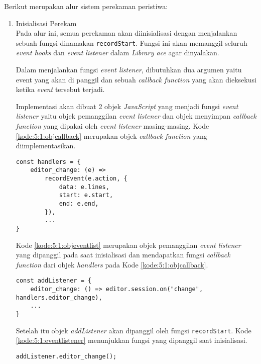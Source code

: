 Berikut merupakan alur sistem perekaman peristiwa:
\begin{enumerate}
    \item Inisialisasi Perekam \\
    Pada alur ini, semua perekaman akan diinisialisasi dengan menjalankan sebuah fungsi dinamakan \verb|recordStart|. Fungsi ini akan memanggil seluruh \textit{event hooks} dan \textit{event listener} dalam \textit{Library ace} agar dinyalakan. 
    
    Dalam menjalankan fungsi \textit{event listener}, dibutuhkan dua argumen yaitu event yang akan di panggil dan sebuah \textit{callback function} yang akan dieksekusi ketika \textit{event} tersebut terjadi. 
    
    Implementasi akan dibuat 2 objek \textit{JavaScript} yang menjadi fungsi \textit{event listener} yaitu objek pemanggilan \textit{event listener} dan objek menyimpan \textit{callback function} yang dipakai oleh \textit{event listener} masing-masing. Kode \ref{kode:5:1:objcallback} merupakan objek \textit{callback function} yang diimplementasikan.
    \begin{lstlisting}[caption={objek \textit{callback function}}, label={kode:5:1:objcallback}]
const handlers = {
    editor_change: (e) =>
        recordEvent(e.action, {
            data: e.lines,
            start: e.start,
            end: e.end,
        }),
        ...
}
    \end{lstlisting}
    
    Kode \ref{kode:5:1:objeventlist} merupakan objek pemanggilan \textit{event listener} yang dipanggil pada saat inisialisasi dan mendapatkan fungsi \textit{callback function} dari objek \textit{handlers} pada Kode \ref{kode:5:1:objcallback}.
    \begin{lstlisting}[caption={objek \textit{event listener}}, label={kode:5:1:objeventlist}]
const addListener = {
    editor_change: () => editor.session.on("change", handlers.editor_change),
    ...
}
    \end{lstlisting}

    Setelah itu objek \textit{addListener} akan dipanggil oleh fungsi \verb|recordStart|. Kode \ref{kode:5:1:eventlistener} menunjukkan fungsi yang dipanggil saat inisialisasi. 
    
    \begin{lstlisting}[caption={Beberapa \textit{event listener} yang dipanggil}, label={kode:5:1:eventlistener}]
addListener.editor_change();
    \end{lstlisting}
    

\end{enumerate}

